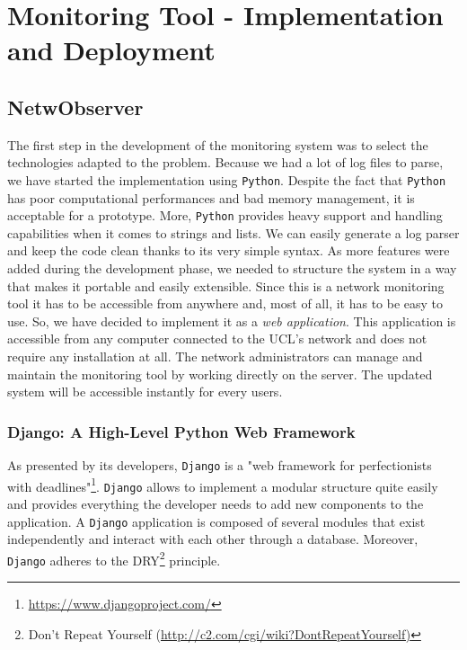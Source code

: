 \chapter{Monitoring Tool - Implementation and Deployment} %

\label{Chapter4} %


\section{NetwObserver}
The first step in the development of the monitoring system was to select the technologies adapted to the problem. Because we had a lot of log files to parse, we have started the implementation using \texttt{Python}. Despite the fact that \texttt{Python} has poor computational performances and bad memory management, it is acceptable for a prototype. More, \texttt{Python} provides heavy support and handling capabilities when it comes to strings and lists. We can easily generate a log parser and keep the code clean thanks to its very simple syntax. As more features were added during the development phase, we needed to structure the system in a way that makes it portable and easily extensible. Since this is a network monitoring tool it has to be accessible from anywhere and, most of all, it has to be easy to use. So, we have decided to implement it as a \emph{web application}. This application is accessible from any computer connected to the UCL's network and does not require any installation at all. The network administrators can manage and maintain the monitoring tool by working directly on the server. The updated system will be accessible instantly for every users.

\subsection{Django: A High-Level Python Web Framework}
As presented by its developers, \texttt{Django} is a "web framework for perfectionists with deadlines"\footnote{\url{https://www.djangoproject.com/}}. \texttt{Django} allows to implement a modular structure quite easily and provides everything the developer needs to add new components to the application. A \texttt{Django} application is composed of several modules that exist independently and interact with each other through a database.
Moreover, \texttt{Django} adheres to the DRY\footnote{Don't Repeat Yourself (\url{http://c2.com/cgi/wiki?DontRepeatYourself)}} principle.

